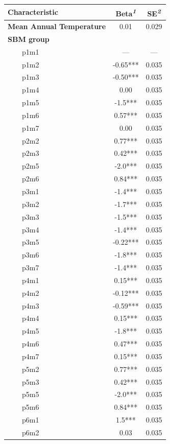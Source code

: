\documentclass[
]{agujournal2019}
\begin{document}
\setlength{\LTpost}{0mm}
\begin{longtable*}{lcc}
\toprule
\textbf{Characteristic} & \textbf{Beta}\textsuperscript{\textit{1}} & \textbf{SE}\textsuperscript{\textit{2}} \\ 
\midrule\addlinespace[2.5pt]
\textbf{Mean Annual Temperature} & 0.01 & 0.029 \\ 
\textbf{SBM group} &  &  \\ 
    p1m1 & — & — \\ 
    p1m2 & -0.65*** & 0.035 \\ 
    p1m3 & -0.50*** & 0.035 \\ 
    p1m4 & 0.00 & 0.035 \\ 
    p1m5 & -1.5*** & 0.035 \\ 
    p1m6 & 0.57*** & 0.035 \\ 
    p1m7 & 0.00 & 0.035 \\ 
    p2m2 & 0.77*** & 0.035 \\ 
    p2m3 & 0.42*** & 0.035 \\ 
    p2m5 & -2.0*** & 0.035 \\ 
    p2m6 & 0.84*** & 0.035 \\ 
    p3m1 & -1.4*** & 0.035 \\ 
    p3m2 & -1.7*** & 0.035 \\ 
    p3m3 & -1.5*** & 0.035 \\ 
    p3m4 & -1.4*** & 0.035 \\ 
    p3m5 & -0.22*** & 0.035 \\ 
    p3m6 & -1.8*** & 0.035 \\ 
    p3m7 & -1.4*** & 0.035 \\ 
    p4m1 & 0.15*** & 0.035 \\ 
    p4m2 & -0.12*** & 0.035 \\ 
    p4m3 & -0.59*** & 0.035 \\ 
    p4m4 & 0.15*** & 0.035 \\ 
    p4m5 & -1.8*** & 0.035 \\ 
    p4m6 & 0.47*** & 0.035 \\ 
    p4m7 & 0.15*** & 0.035 \\ 
    p5m2 & 0.77*** & 0.035 \\ 
    p5m3 & 0.42*** & 0.035 \\ 
    p5m5 & -2.0*** & 0.035 \\ 
    p5m6 & 0.84*** & 0.035 \\ 
    p6m1 & 1.5*** & 0.035 \\ 
    p6m2 & 0.03 & 0.035 \\ 

\end{longtable*}
\end{document}
